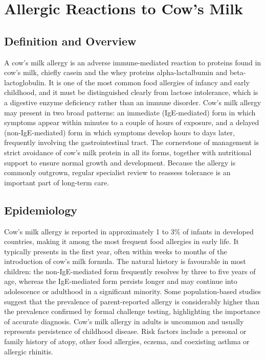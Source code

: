 \chapter{Allergic Reactions to Cow's Milk}

\section*{Definition and Overview}
A cow's milk allergy is an adverse immune-mediated reaction to proteins found in cow's milk, chiefly casein and the whey proteins alpha-lactalbumin and beta-lactoglobulin. It is one of the most common food allergies of infancy and early childhood, and it must be distinguished clearly from lactose intolerance, which is a digestive enzyme deficiency rather than an immune disorder. Cow's milk allergy may present in two broad patterns: an immediate (IgE-mediated) form in which symptoms appear within minutes to a couple of hours of exposure, and a delayed (non-IgE-mediated) form in which symptoms develop hours to days later, frequently involving the gastrointestinal tract. The cornerstone of management is strict avoidance of cow's milk protein in all its forms, together with nutritional support to ensure normal growth and development. Because the allergy is commonly outgrown, regular specialist review to reassess tolerance is an important part of long-term care.

\section*{Epidemiology}
Cow's milk allergy is reported in approximately 1 to 3\% of infants in developed countries, making it among the most frequent food allergies in early life. It typically presents in the first year, often within weeks to months of the introduction of cow's milk formula. The natural history is favourable in most children: the non-IgE-mediated form frequently resolves by three to five years of age, whereas the IgE-mediated form persists longer and may continue into adolescence or adulthood in a significant minority. Some population-based studies suggest that the prevalence of parent-reported allergy is considerably higher than the prevalence confirmed by formal challenge testing, highlighting the importance of accurate diagnosis. Cow's milk allergy in adults is uncommon and usually represents persistence of childhood disease. Risk factors include a personal or family history of atopy, other food allergies, eczema, and coexisting asthma or allergic rhinitis.

